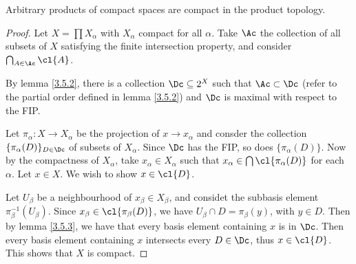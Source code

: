 \begin{theorem}\label{3.5.4}
    Arbitrary products of compact spaces are compact in the product topology.
\end{theorem}
\begin{proof}
    Let $X=\prod{X_\alpha}$ with $X_\alpha$ compact for all  $\alpha$. Take  $\Ac$ the collection of
    all subsets of  $X$ satisfying the finite intersection property, and consider  $\bigcap_{A \in
    \Ac}{\cl{A}}$.

    By lemma \ref{3.5.2}, there is a collection $\Dc \subseteq 2^X$ such that  $\Ac \subset \Dc$
    (refer to the partial order defined in lemma \ref{3.5.2}) and $\Dc$ is maximal with respect to
    the FIP.

    Let  $\pi_\alpha:X \rightarrow X_\alpha$ be the projection of $x \rightarrow x_\alpha$ and
    consder the collection $\{\pi_\alpha(D)\}_{D \in \Dc}$ of subsets of $X_\alpha$. Since  $\Dc$
    has the FIP,  so does  $\{\pi_\alpha(D)\}$. Now by the compactness of  $X_\alpha$, take
    $x_\alpha \in X_\alpha$ such that  $x_\alpha \in \bigcap{\cl{\pi_\alpha(D)}}$ for each $\alpha$.
    Let  $x \in X$. We wish to show  $x \in \cl{D}$.

    Let $U_\beta$ be a neighbourhood of  $x_\beta \in X_\beta$, and considet the subbasis element
    $\pi^{-1}_\beta(U_\beta)$. Since $x_\beta \in \cl{\pi_\beta(D)}$, we have $U_\beta \cap
    D=\pi_\beta(y)$, with $y \in D$. Then by lemma \ref{3.5.3}, we have that every basis element
    containing $x$ is in  $\Dc$. Then every basis element containing  $x$ intersects every $D \in
    \Dc$, thus  $x \in \cl{D}$. This shows that $X$ is compact.
\end{proof}
